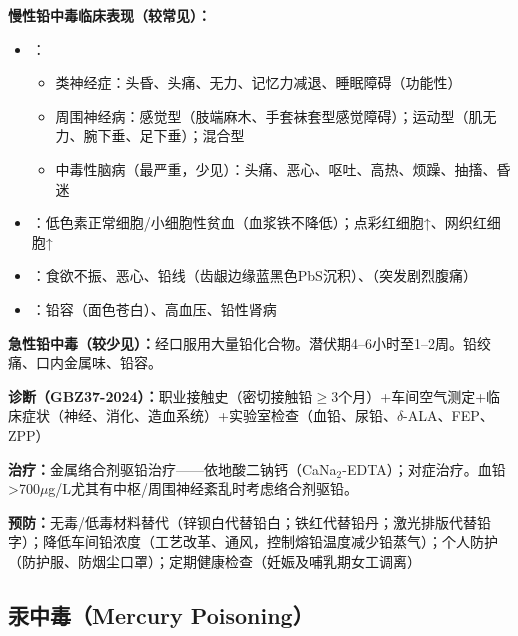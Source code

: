 \begin{keybox}
\textbf{慢性铅中毒临床表现（较常见）：}
\begin{itemize}[leftmargin=*]
    \item {}：
    \begin{itemize}
        \item 类神经症：头昏、头痛、无力、记忆力减退、睡眠障碍（功能性）
        \item 周围神经病：感觉型（肢端麻木、手套袜套型感觉障碍）；运动型（肌无力、腕下垂、足下垂）；混合型
        \item 中毒性脑病（最严重，少见）：头痛、恶心、呕吐、高热、烦躁、抽搐、昏迷
    \end{itemize}
    \item {}：低色素正常细胞/小细胞性贫血（血浆铁不降低）；点彩红细胞↑、网织红细胞↑
    \item {}：食欲不振、恶心、铅线（齿龈边缘蓝黑色PbS沉积）、（突发剧烈腹痛）
    \item {}：铅容（面色苍白）、高血压、铅性肾病
\end{itemize}

\textbf{急性铅中毒（较少见）：}经口服用大量铅化合物。潜伏期4--6小时至1--2周。铅绞痛、口内金属味、铅容。

\textbf{诊断（GBZ37-2024）：}职业接触史（密切接触铅$\geq$3个月）+车间空气测定+临床症状（神经、消化、造血系统）+实验室检查（血铅、尿铅、$\delta$-ALA、FEP、ZPP）

\textbf{治疗：}金属络合剂驱铅治疗——依地酸二钠钙（CaNa$_2$-EDTA）；对症治疗。血铅>700$\mu$g/L尤其有中枢/周围神经紊乱时考虑络合剂驱铅。

\textbf{预防：}无毒/低毒材料替代（锌钡白代替铅白；铁红代替铅丹；激光排版代替铅字）；降低车间铅浓度（工艺改革、通风，控制熔铅温度减少铅蒸气）；个人防护（防护服、防烟尘口罩）；定期健康检查（妊娠及哺乳期女工调离）
\end{keybox}

\subsection{汞中毒（Mercury Poisoning）}

